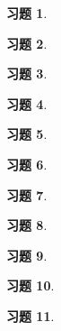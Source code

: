 \documentclass{ctexart}
\newtheorem{problem}{习题}[section]
\begin{document}
\begin{problem}\



\end{problem}

\begin{problem}\



\end{problem}

\begin{problem}\



\end{problem}

\begin{problem}\



\end{problem}

\setcounter{problem}{34}
\begin{problem}\



\end{problem}

\setcounter{problem}{36}
\begin{problem}\



\end{problem}

\setcounter{problem}{39}
\begin{problem}\



\end{problem}

\begin{problem}\



\end{problem}

\setcounter{problem}{43}
\begin{problem}\



\end{problem}

\setcounter{problem}{45}
\begin{problem}\



\end{problem}

\begin{problem}\



\end{problem}
\end{document}
